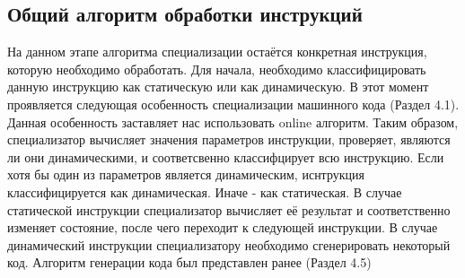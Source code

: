 \documentclass{spbau-diploma}
\begin{document}
\subsection{Общий алгоритм обработки инструкций}
На данном этапе алгоритма специализации остаётся конкретная инструкция, которую необходимо обработать. Для начала, необходимо классифицировать данную инструкцию как статическую или как динамическую. В этот момент проявляется следующая особенность специализации машинного кода (Раздел 4.1). Данная особенность заставляет нас использовать online алгоритм. Таким образом, специализатор вычисляет значения параметров инструкции, проверяет, являются ли они динамическими, и соответсвенно классифцирует всю инструкцию. Если хотя бы один из параметров является динамическим, иснтрукция классифицируется как динамическая. Иначе - как статическая.
В случае статической инструкции специализатор вычисляет её результат и соответственно изменяет состояние, после чего переходит к следующей инструкции.
В случае динамический инструкции специализатору необходимо сгенерировать некоторый код. Алгоритм генерации кода был представлен ранее (Раздел 4.5)
\end{document}
